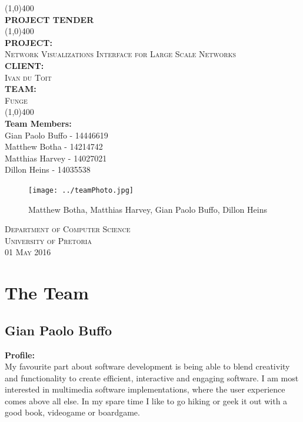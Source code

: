 \documentclass{article}
\begin{document}
\begin{titlepage}
	\begin{center}
		\line(1,0){400}\\
		[6mm]
		\huge{\bfseries PROJECT TENDER}\\
		[2mm]
		\line(1,0){400}\\
		[5mm]
		\large\textbf{PROJECT:}\\\textsc{Network Visualizations Interface for Large Scale Networks}\\
		[3mm]
		\large\textbf{CLIENT:}\\\textsc{Ivan du Toit}\\
		[3mm]
		\large \textbf{TEAM:}\\\textsc{Funge}\\
		\line(1,0){400}\\
		[5mm]
		\large \textbf{Team Members:}\\
		[3mm]
		\large Gian Paolo Buffo - 14446619\\
		\large Matthew Botha - 14214742\\
		\large Matthias Harvey - 14027021\\
        \large Dillon Heins - 14035538\\[3mm]
		\begin{figure}[H]
			\centering
			\texttt{[image: ../teamPhoto.jpg]}
			\caption{Matthew Botha, Matthias Harvey, Gian Paolo Buffo, Dillon Heins}
		\end{figure}
    \end{center}

	\vspace{7mm}

    \begin{flushright}
        \textsc{\large Department of Computer Science\\
        University of Pretoria\\
        01 May 2016\\}
    \end{flushright}
\end{titlepage}

\section{The Team}
	\subsection{Gian Paolo Buffo}
	\textbf{Profile:}\\
	My favourite part about software development is being able to blend creativity and functionality to create efficient, interactive and engaging software. I am most interested in multimedia software implementations, where the user experience comes above all else. In my spare time I like to go hiking or geek it out with a good book, videogame or boardgame.  
\end{document}
